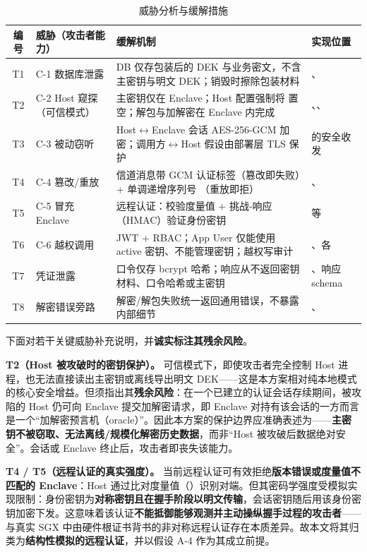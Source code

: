 \begin{table}[H]
\centering
\caption{威胁分析与缓解措施}
\label{tab:threats}
\footnotesize
\begin{tabularx}{\textwidth}{c L{3.3cm} Y L{3.4cm}}
\toprule
编号 & 威胁（攻击者能力） & 缓解机制 & 实现位置 \\
\midrule
T1 & C-1 数据库泄露 & DB 仅存包装后的 DEK 与业务密文，不含主密钥与明文 DEK；销毁时擦除包装材料 & 、 \\
T2 & C-2 Host 窥探（可信模式） & 主密钥仅在 Enclave；Host 配置强制将  置空；解包与加解密在 Enclave 内完成 & 、、 \\
T3 & C-3 被动窃听 & Host$\leftrightarrow$Enclave 会话 AES-256-GCM 加密；调用方$\leftrightarrow$Host 假设由部署层 TLS 保护 &  的安全收发 \\
T4 & C-4 篡改/重放 & 信道消息带 GCM 认证标签（篡改即失败）+ 单调递增序列号 （重放即拒） & 、 \\
T5 & C-5 冒充 Enclave & 远程认证：校验度量值 + 挑战-响应（HMAC）验证身份密钥 &  等 \\
T6 & C-6 越权调用 & JWT + RBAC；App User 仅能使用 active 密钥、不能管理密钥；越权写审计 & 、各  \\
T7 & 凭证泄露 & 口令仅存 bcrypt 哈希；响应从不返回密钥材料、口令哈希或主密钥 & 、响应 schema \\
T8 & 解密错误旁路 & 解密/解包失败统一返回通用错误，不暴露内部细节 & 、 \\
\bottomrule
\end{tabularx}
\end{table}

下面对若干关键威胁补充说明，并\textbf{诚实标注其残余风险}。

\textbf{T2（Host 被攻破时的密钥保护）。} 可信模式下，即使攻击者完全控制 Host 进程，也无法直接读出主密钥或离线导出明文 DEK——这是本方案相对纯本地模式的核心安全增益。但须指出其\textbf{残余风险}：在一个已建立的认证会话存续期间，被攻陷的 Host 仍可向 Enclave 提交加解密请求，即 Enclave 对持有该会话的一方而言是一个“加解密预言机（oracle）”。因此本方案的保护边界应准确表述为——\textbf{主密钥不被窃取、无法离线/规模化解密历史数据}，而非“Host 被攻破后数据绝对安全”。会话或 Enclave 终止后，攻击者即丧失该能力。

\textbf{T4 / T5（远程认证的真实强度）。} 当前远程认证可有效拒绝\textbf{版本错误或度量值不匹配的 Enclave}：Host 通过比对度量值（）识别对端。但其密码学强度受模拟实现限制：身份密钥为\textbf{对称密钥且在握手阶段以明文传输}，会话密钥随后用该身份密钥加密下发。这意味着该认证\textbf{不能抵御能够观测并主动操纵握手过程的攻击者}——与真实 SGX 中由硬件根证书背书的非对称远程认证存在本质差异。故本文将其归类为\textbf{结构性模拟的远程认证}，并以假设 A-4 作为其成立前提。

